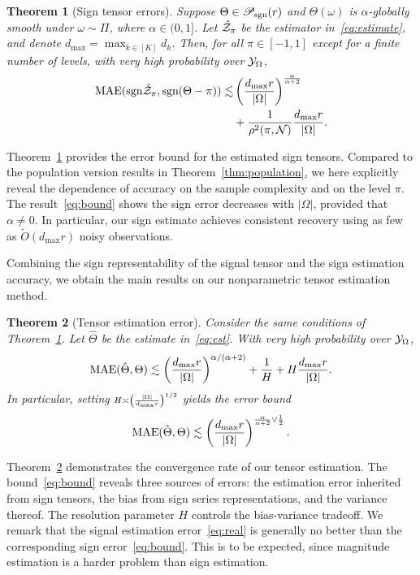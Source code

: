 \documentclass{article}
\theoremstyle{plain}
\newtheorem{thm}{Theorem}
\theoremstyle{definition}
\def\sign{\textup{sgn}}
\def\caliP{\mathscr{P}_{\textup{sgn}}}
\begin{document}
 \begin{thm}[Sign tensor errors]\label{thm:classification} Suppose $\Theta\in\caliP(r)$ and $\Theta(\omega)$ is $\alpha$-globally smooth under $\omega\sim \Pi$, where $\alpha\in(0,1]$. Let $\hat {\mathcal{Z}}_\pi$ be the estimator in~\eqref{eq:estimate}, and denote $d_{\max}=\max_{k\in[K]} d_k$. Then, for all $\pi\in[-1,1]$ except for a finite number of levels, with very high probability over $\mathcal{Y}_\Omega$, 
\begin{align}\label{eq:bound}
\textup{MAE}(\sign \hat \tZ_\pi, \sign(\Theta-\pi)) \lesssim & \left({d_{\max} r \over |\Omega|}\right)^{\alpha\over \alpha+2}\notag \\
&+{1 \over \rho^2(\pi, \tN)} {d_{\max}r \over |\Omega|}.
\end{align}
\end{thm}
Theorem~\ref{thm:classification} provides the error bound for the estimated sign tensors. Compared to the population version results in Theorem~\ref{thm:population}, we here explicitly reveal the dependence of accuracy on the sample complexity and on the level $\pi$. The result~\eqref{eq:bound} shows the sign error decreases with $|\Omega|$, provided that $\alpha \neq 0$. In particular, our sign estimate achieves consistent recovery using as few as $\tilde O(d_{\max}r)$ noisy observations. 


Combining the sign representability of the signal tensor and the sign estimation accuracy, we obtain the main results on our nonparametric tensor estimation method.
\begin{thm}[Tensor estimation error]\label{thm:estimation} Consider the same conditions of Theorem~\ref{thm:classification}. Let $\hat \Theta$ be the estimate in~\eqref{eq:est}. With very high probability over $\mathcal{Y}_\Omega$,
\begin{equation}\label{eq:bound}
\textup{MAE}(\hat \Theta, \Theta)\lesssim \left({d_{\max} r \over |\Omega|}\right)^{\alpha/(\alpha+2)}+{1\over H}+H{d_{\max} r \over |\Omega|}.
\end{equation}
In particular, setting $\scriptstyle H\asymp \left( |\Omega|\over d_{\max}r\right)^{1/2}$ yields the error bound
\begin{equation}\label{eq:real}
\textup{MAE}(\hat \Theta, \Theta)\lesssim \left(d_{\max}r \over|\Omega|\right)^{{\alpha \over \alpha+2} \vee {1\over 2}}.
\end{equation}
\end{thm}
Theorem~\ref{thm:estimation} demonstrates the convergence rate of our tensor estimation. The bound~\eqref{eq:bound} reveals three sources of errors: the estimation error inherited from sign tensors, the bias from sign series representations, and the variance thereof. The resolution parameter $H$ controls the bias-variance tradeoff. We remark that the signal estimation error~\eqref{eq:real} is generally no better than the corresponding sign error~\eqref{eq:bound}. This is to be expected, since magnitude estimation is a harder problem than sign estimation. 
\end{document}

